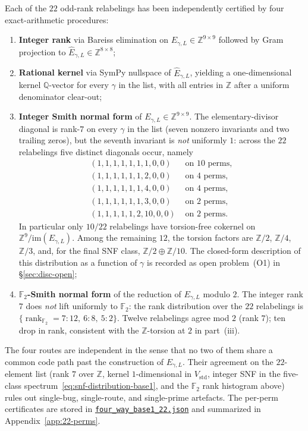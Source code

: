 \documentclass[11pt,a4paper]{article}
\theoremstyle{definition}
\theoremstyle{remark}
\providecommand{\Z}{\mathbb{Z}}
\providecommand{\Q}{\mathbb{Q}}
\providecommand{\rank}{\operatorname{rank}}
\newcommand{\Egamma}{E_{\gamma,L}}
\newcommand{\Ehat}{\widehat{E}_{\gamma,L}}
\begin{document}
Each of the $22$ odd-rank relabelings has been independently certified
by four exact-arithmetic procedures:
\begin{enumerate}[label=(\roman*),leftmargin=*]
   \item \textbf{Integer rank} via Bareiss elimination on $\Egamma \in
   \Z^{9 \times 9}$ followed by Gram projection to $\Ehat \in
   \Z^{8 \times 8}$;
   \item \textbf{Rational kernel} via SymPy nullspace of $\Ehat$,
   yielding a one-dimensional kernel $\Q$-vector for every
   $\gamma$ in the list, with all entries in $\Z$ after a uniform
   denominator clear-out;
   \item \textbf{Integer Smith normal form} of $\Egamma \in
   \Z^{9 \times 9}$. The elementary-divisor diagonal is rank-$7$ on
   every $\gamma$ in the list (seven nonzero invariants and two
   trailing zeros), but the seventh invariant is \emph{not} uniformly
   $1$: across the $22$ relabelings five distinct diagonals occur,
   namely
   \begin{equation}\label{eq:snf-distribution-base1}
      \begin{array}{ll}
         (1,1,1,1,1,1,1,0,0)  & \text{ on } 10\text{ perms}, \\
         (1,1,1,1,1,1,2,0,0)  & \text{ on }  4\text{ perms}, \\
         (1,1,1,1,1,1,4,0,0)  & \text{ on }  4\text{ perms}, \\
         (1,1,1,1,1,1,3,0,0)  & \text{ on }  2\text{ perms}, \\
         (1,1,1,1,1,2,10,0,0) & \text{ on }  2\text{ perms}.
      \end{array}
   \end{equation}
   In particular only $10/22$ relabelings have torsion-free cokernel
   on $\Z^9 / \mathrm{im}(\Egamma)$. Among the remaining $12$, the
   torsion factors are $\Z/2$, $\Z/4$, $\Z/3$, and, for the final
   SNF class, $\Z/2 \oplus \Z/10$. The closed-form
   description of this distribution as a function of $\gamma$ is
   recorded as open problem~(O1) in \S\ref{sec:disc-open};
   \item \textbf{$\mathbb{F}_2$-Smith normal form} of the reduction of
   $\Egamma$ modulo $2$. The integer rank $7$ does \emph{not} lift
   uniformly to $\mathbb{F}_2$: the rank distribution over the $22$
   relabelings is $\{\rank_{\mathbb{F}_2}\!=\!7 : 12,\ 6 : 8,\ 5 :
   2\}$. Twelve relabelings agree mod $2$ (rank $7$); ten drop in
   rank, consistent with the $\Z$-torsion at $2$ in part~(iii).
\end{enumerate}
The four routes are independent in the sense that no two of them
share a common code path past the construction of $\Egamma$. Their
agreement on the $22$-element list (rank $7$ over $\Z$, kernel
$1$-dimensional in $V_{\mathrm{std}}$, integer SNF in the five-class
spectrum~\eqref{eq:snf-distribution-base1}, and the $\mathbb{F}_2$
rank histogram above) rules out single-bug, single-route, and
single-prime artefacts. The per-perm certificates are stored in
\href{../certified/four_way_base1_22.json}{\texttt{four\_way\_base1\_22.json}}
and summarized in Appendix~\ref{app:22-perms}.
\end{document}
